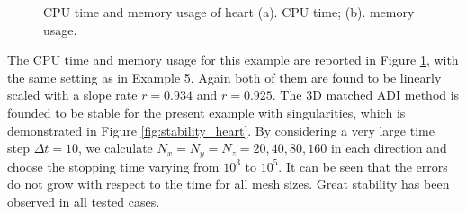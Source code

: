 \documentclass[dissertation]{uathesis}
\begin{document}
\begin{body}
\begin{figure}[!ht]
\begin{center}
	\end{center}
	\caption{CPU time and memory usage of heart (a). CPU time; (b). memory usage.}
	\label{fig:CPU_Memory_heart}
\end{figure}
%
The CPU time and memory usage for this example are reported in Figure \ref{fig:CPU_Memory_heart}, with the same setting as in Example 5. Again both of them are found to be linearly scaled with a slope rate $r=0.934$ and $r=0.925$. The 3D matched ADI method is founded to be stable for the present example with singularities, which is demonstrated in Figure \ref{fig:stability_heart}. By considering a very large time step $\Delta t=10$, we calculate $N_x=N_y=N_z=20,40,80,160$ in each direction and choose the stopping time varying from $10^{3}$ to $10^{5}$. It can be seen that the errors do not grow with respect to the time for all mesh sizes.  Great stability has been observed in all tested cases.


\end{body}
\end{document}
